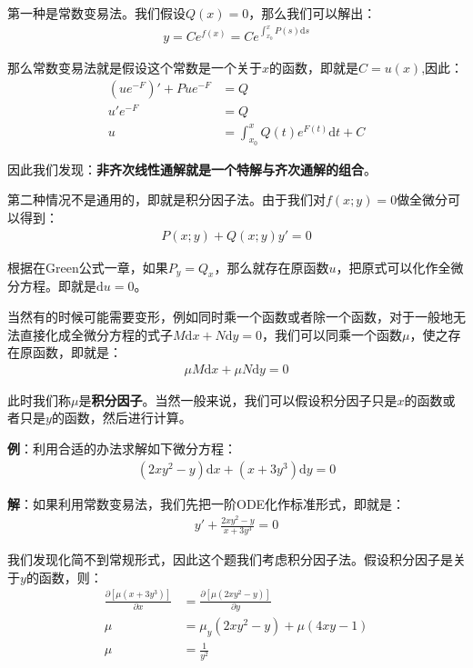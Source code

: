 \documentclass{ctexart}
\let\oldtextbf\textbf
\renewcommand{\textbf}[1]{\textcolor{brown!50!red}{\oldtextbf{#1}}}
\begin{document}
第一种是常数变易法。我们假设$Q(x)=0$，那么我们可以解出：
\begin{align*}
    y=Ce^{f(x)}=Ce^{\int_{x_0}^xP(s)\mathrm{d}s}
\end{align*}

那么常数变易法就是假设这个常数是一个关于$x$的函数，即就是$C=u(x)$,因此：
\begin{align*}
   (ue^{-F})'+Pue^{-F}&=Q
\\u'e^{-F}&=Q\\
u&=\int_{x_0}^xQ(t)e^{F(t)}\mathrm{d}t+C 
\end{align*}

因此我们发现：\textbf{\color{brown!50!red}非齐次线性通解就是一个特解与齐次通解的组合}。

第二种情况不是通用的，即就是积分因子法。由于我们对$f(x;y)=0$做全微分可以得到：
\begin{align*}
    P(x;y)+Q(x;y)y'=0
\end{align*}

根据在Green公式一章，如果$P_y=Q_x$，那么就存在原函数$u$，把原式可以化作全微分方程。即就是$\mathrm{d}u=0$。

当然有的时候可能需要变形，例如同时乘一个函数或者除一个函数，对于一般地无法直接化成全微分方程的式子$M\mathrm{d}x+N\mathrm{d}y=0$，我们可以同乘一个函数$\mu$，使之存在原函数，即就是：
\begin{align*}
    \mu M\mathrm{d}x+\mu N\mathrm{d}y=0
\end{align*}

此时我们称$\mu$是\textbf{\color{brown!50!red}积分因子}。当然一般来说，我们可以假设积分因子只是$x$的函数或者只是$y$的函数，然后进行计算。

\textbf{\color{brown!50!red}例}：利用合适的办法求解如下微分方程：
\begin{align*}
    (2xy^2-y)\mathrm{d}x+(x+3y^3)\mathrm{d}y=0
\end{align*}

\textbf{\color{brown!50!red}解}：如果利用常数变易法，我们先把一阶ODE化作标准形式，即就是：
\begin{align*}
 y'+\frac{2xy^2-y}{x+3y^3}=0 
\end{align*}

我们发现化简不到常规形式，因此这个题我们考虑积分因子法。假设积分因子是关于$y$的函数，则：
\begin{align*}
 \frac{\partial [\mu(x+3y^3)]}{\partial x }&=\frac{\partial[\mu(2xy^2-y)]}{\partial y}\\
 \mu&=\mu_y(2xy^2-y)+\mu(4xy-1)\\
\mu&=\frac{1}{y^2}
\end{align*}
\end{document}
